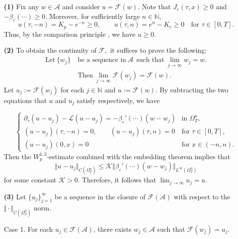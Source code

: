 \documentclass[11pt, a4paper, leqno]{amsart}
\numberwithin{equation}{section}
\theoremstyle{plain}
\theoremstyle{definition}
\theoremstyle{remark}
\def\leq{\leqslant}
\def\geq{\geqslant}
\begin{document}
\medskip
\noindent\textbf{(1)}
Fix any $w\in \mathcal{A}$ and consider $u=\mathcal{F}(w).$ 
Note that $J_{\varepsilon}(\tau,x)\geq 0$ and
$-\beta_\varepsilon(\cdots)\geq 0$.
{
Moreover, for sufficiently large $n\in\mathbb{N}$,
\[
    u(\tau,-n)=K_p-e^{-n}\geq0,
    \qquad
    u(\tau,n)=e^n-K_c\geq0
    \quad\text{for }\tau\in[0,T].
\]
}
Thus, by the comparison principle \cite[Theorem 1.1]{YY08}, we have $u\geq0.$

\medskip
\noindent\textbf{(2)}
To obtain the continuity of $\mathcal{F},$ it suffices to prove the following:
\begin{align*}
\text{Let} \ \{w_j\}\  &\text{be a sequence in}\
\mathcal{A}\ \  \text{such that} \ 
\displaystyle{\lim_{ j \to \infty}w_j}=w.\\
&\text{Then}\  
\displaystyle{\lim_{j \to \infty}\mathcal{F}(w_j)}=\mathcal{F}(w).
\end{align*}
Let $u_j:=\mathcal{F}(w_j)$ for each $j\in \mathbb{N}$ and
$u:=\mathcal{F}(w).$
By subtracting the two equations that $u$ and $u_j$ satisfy respectively, we have

{
\begin{equation*}
    \begin{cases}
        \partial_\tau (u-u_j)-\mathcal{L}(u-u_j)
        =-\beta_\varepsilon'(\cdots)(w-w_j)
        & \text{in }\Omega_T^n,
        \\
        (u-u_j)(\tau,-n)=0,
        \qquad
        (u-u_j)(\tau,n)=0
        & \text{for }\tau\in[0,T],
        \\
        (u-u_j)(0,x)=0
        & \text{for }x\in(-n,n).
    \end{cases}
\end{equation*}
}
Then the $W^{1,2}_p$-estimate \cite[Theorem 9.1, p.341]{LSU68} combined with the embedding theorem implies that 
\[
    \Vert u-u_j \Vert_{C(\overline{\Omega_T^n})}
    \leq
    \mathcal{K}
    \Vert\beta_\varepsilon'(\cdots)(w-w_j)
    \Vert_{L^\infty(\Omega_T^n)}
\]
for some constant $\mathcal{K}>0$.
Therefore, it follows that
$\displaystyle{\lim_{j \to \infty}u_j}= u.$

\medskip
\noindent\textbf{(3)}
Let $\{u_j\}_{j=1}^\infty$ be a sequence in the closure of
$\mathcal{F}(\mathcal{A})$ with respect to the
$\Vert\cdot\Vert_{C(\overline{\Omega_T^n})}$ norm.

\medskip
\noindent Case 1.
For each $u_j\in \mathcal{F}(\mathcal{A})$, there exists
$w_j\in\mathcal{A}$ such that $\mathcal{F}(w_j)=u_j$.
\end{document}
